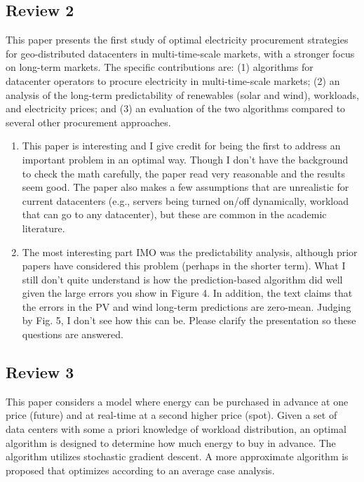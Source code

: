 \subsection{Review 2}

This paper presents the first study of optimal electricity procurement strategies for geo-distributed datacenters in multi-time-scale markets, with a stronger focus on long-term markets.  The specific contributions are: (1) algorithms for datacenter operators to procure electricity in multi-time-scale markets; (2) an analysis of the long-term predictability of renewables (solar and wind), workloads, and electricity prices; and (3) an evaluation of the two algorithms compared to several other procurement approaches.

\begin{enumerate}
	\item This paper is interesting and I give credit for being the first to address an important problem in an optimal way.  Though I don't have the background to check the math carefully, the paper read very reasonable and the results seem good. The paper also makes a few assumptions that are unrealistic for current datacenters (e.g., servers being turned on/off dynamically, workload that can go to any datacenter), but these are common in the academic literature.  
	\item The most interesting part IMO was the predictability analysis, although prior papers have considered this problem (perhaps in the shorter term).  What I still don't quite understand is how the prediction-based algorithm did well given the large errors you show in Figure 4.  In addition, the text claims that the errors in the PV and wind long-term predictions are zero-mean.  Judging by Fig. 5, I don't see how this can be.  Please clarify the presentation so these questions are answered. 
\end{enumerate}

\subsection{Review 3}

This paper considers a model where energy can be purchased in advance at one price (future) and at real-time at a second higher price (spot).  Given a set of data centers with some a priori knowledge of workload distribution, an optimal algorithm is designed to determine how much energy to buy in advance.  The algorithm utilizes stochastic gradient descent.  A more approximate algorithm is proposed that optimizes according to an average case analysis.

